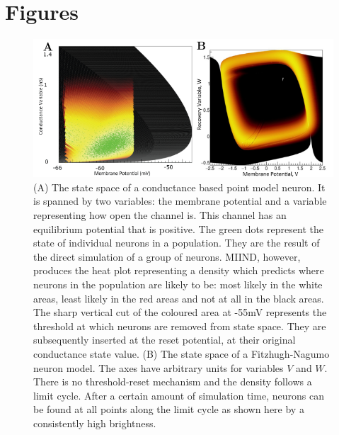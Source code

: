 \documentclass[utf8]{frontiersSCNS} %
\begin{document}
\section*{Figures}


\begin{figure}[htb!]
  \centering
    \includegraphics[width=\linewidth]{images/cloud_full_figure.pdf}
  \caption{(A) The state space of a conductance based point model neuron. It is spanned by two variables: the membrane potential and a variable representing how open the channel is. This channel has an equilibrium potential that is positive. The green dots represent the state of individual neurons in a population. They are the result of the direct simulation of a group of neurons. MIIND, however, produces the heat plot representing a density which predicts where neurons in the population are likely to be: most likely in the white areas, least likely in  the red areas and not at all in the black areas. The sharp vertical cut of the coloured area at -55mV represents the threshold at which neurons are removed from state space. They are subsequently inserted at the reset potential, at their original conductance state value. (B) The state space of a Fitzhugh-Nagumo neuron model. The axes have arbitrary units for variables $V$ and $W$. There is no threshold-reset mechanism and the density follows a limit cycle. After a certain amount of simulation time, neurons can be found at all points along the limit cycle as shown here by a consistently high brightness.}
  \label{fig-cloud}
\end{figure}
\end{document}
